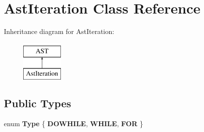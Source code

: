 \hypertarget{classAstIteration}{\section{Ast\-Iteration Class Reference}
\label{classAstIteration}
}
Inheritance diagram for Ast\-Iteration\-:\begin{figure}[H]
\begin{center}
\leavevmode
\includegraphics[height=2.000000cm]{classAstIteration}
\end{center}
\end{figure}
\subsection*{Public Types}
\begin{DoxyCompactItemize}
\item 
enum {\bfseries Type} \{ {\bfseries D\-O\-W\-H\-I\-L\-E}, 
{\bfseries W\-H\-I\-L\-E}, 
{\bfseries F\-O\-R}
 \}
\end{DoxyCompactItemize}
